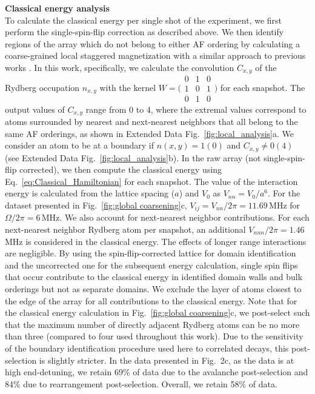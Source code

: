 \documentclass[reprint,twocolumn,secnumarabic,amssymb, aps, prx]{revtex4-2}
\begin{document}
\noindent\textbf{Classical energy analysis}\\
To calculate the classical energy per single shot of the experiment, we first perform the single-spin-flip correction as described above. We then identify regions of the array which do not belong to either AF ordering by calculating a coarse-grained local staggered magnetization with a similar approach to previous works \cite{ebadi2021quantum}. In this work, specifically, we calculate the convolution $C_{x,y}$ of the Rydberg occupation $n_{x,y}$ with the kernel $ W = \big(\begin{smallmatrix}
  0 & 1 & 0\\
  1 & 0 & 1\\
  0 & 1 & 0
\end{smallmatrix}\big)$ for each snapshot. The output values of $C_{x,y}$ range from 0 to 4, where the extremal values correspond to atoms surrounded by nearest and next-nearest neighbors that all belong to the same AF orderings, as shown in Extended Data Fig.~\ref{fig:local_analysis}a. We consider an atom to be at a boundary if $n(x,y)= 1 (0)$ and $C_{x,y}\neq0(4)$ (see Extended Data Fig.~\ref{fig:local_analysis}b). In the raw array (not single-spin-flip corrected), we then compute the classical energy using Eq.~\eqref{eq:Classical_Hamiltonian} for each snapshot. 
The value of the interaction energy is calculated from the lattice spacing ($a$) and $V_0$ as $V_{nn} = V_0/a^6$. For the dataset presented  in Fig.~\ref{fig:global coarsening}c, $V_{ij} = V_{nn}/2\pi = 11.69$\,MHz for $\Omega/2\pi = 6$\,MHz. We  also account for next-nearest neighbor contributions. For each next-nearest neighbor Rydberg atom per snapshot, an additional $V_{nnn}/2\pi = 1.46$\,MHz is considered in the classical energy. The effects of longer range interactions are negligible. By using the spin-flip-corrected lattice for domain identification and the uncorrected one for the subsequent energy calculation, single spin flips that occur contribute to the classical energy in identified domain walls and bulk orderings but not as separate domains. We exclude the layer of atoms closest to the edge of the array for all contributions to the classical energy. Note that for the classical energy calculation in Fig.~\ref{fig:global coarsening}c, we post-select such that the maximum number of directly adjacent Rydberg atoms can be no more than three (compared to four used throughout this work). Due to the sensitivity of the boundary identification procedure used here to correlated decays, this post-selection is slightly stricter. In the data presented in Fig.~2c, as the data is at high end-detuning, we retain 69\% of data due to the avalanche post-selection and 84\% due to rearrangement post-selection. Overall, we retain 58\% of data.\\
\end{document}
